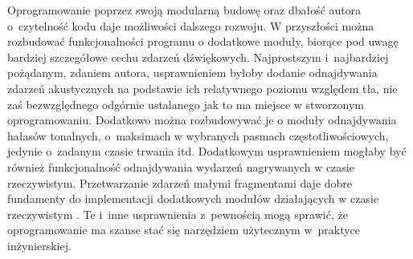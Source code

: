 \documentclass[eng,printmode]{mgr}
\begin{document}
Oprogramowanie poprzez swoją modularną budowę oraz dbałość autora o~czytelność kodu daje możliwości dalszego rozwoju. W przyszłości można rozbudować funkcjonalności programu o dodatkowe moduły, biorące pod uwagę bardziej szczegółowe cechu zdarzeń dźwiękowych. Najprostszym i~najbardziej pożądanym, zdaniem autora, usprawnieniem byłoby dodanie odnajdywania zdarzeń akustycznych na podstawie ich relatywnego poziomu względem tła, nie zaś bezwzględnego odgórnie ustalanego jak to ma miejsce w stworzonym oprogramowaniu. Dodatkowo można rozbudowywać je o moduły odnajdywania hałasów tonalnych, o~maksimach w wybranych pasmach częstotliwościowych, jedynie o~zadanym czasie trwania itd. Dodatkowym usprawnieniem mogłaby być również funkcjonalność odnajdywania wydarzeń nagrywanych w czasie rzeczywistym. Przetwarzanie zdarzeń małymi fragmentami daje dobre fundamenty do implementacji dodatkowych modułów działających w czasie rzeczywistym . Te i~inne usprawnienia z~pewnością mogą sprawić, że oprogramowanie ma szanse stać się narzędziem użytecznym w~praktyce inżynierskiej.
\appendix
{} %
\listoffigures
\lstlistoflistings
\end{document}
